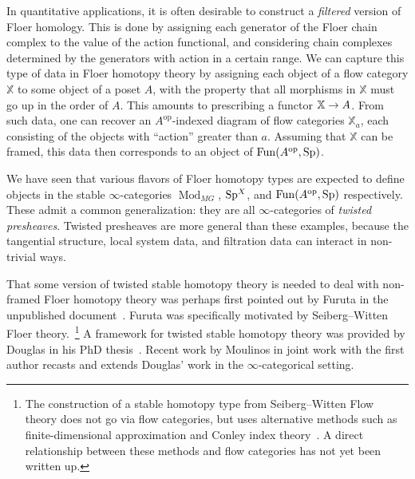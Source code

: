 \documentclass[10pt]{amsart}
\numberwithin{equation}{section}
\theoremstyle{definition}
\DeclareMathOperator{\Fun}{Fun}
\DeclareMathOperator{\Mod}{Mod}
\DeclareMathOperator{\op}{op}
\newcommand{\bX}{\mathbb{X}}
\newcommand{\Sp}{\mathrm{Sp}\vphantom{p}}
\renewcommand{\to}{\mathchoice{\longrightarrow}{\rightarrow}{}{}}
\begin{document}
In quantitative applications, it is often desirable to construct a \emph{filtered} version of Floer homology.
This is done by assigning each generator of the Floer chain complex to the value of the action functional, and considering chain complexes determined by the generators with action in a certain range.
We can capture this type of data in Floer homotopy theory by assigning each object of a flow category $\bX$ to some object of a poset $A$, with the property that all morphisms in $\bX$ must go up in the order of $A$.
This amounts to prescribing a functor $\bX\to A$.
From such data, one can recover an $A^{\op}$-indexed diagram of flow categories $\bX_{a}$, each consisting of the objects with ``action'' greater than $a$. Assuming that $\bX$ can be framed, this data then corresponds to an object of $\Fun(A^{\op},\Sp)$.

We have seen that various flavors of Floer homotopy types are expected to define objects in the stable $\infty$-categories $\Mod_{MG}$, $\Sp^{X}$, and $\Fun(A^{\op},\Sp)$ respectively.
These admit a common generalization: they are all  $\infty$-categories of \emph{twisted presheaves}.
Twisted presheaves are more general than these examples, because the tangential structure, local system data, and filtration data can interact in non-trivial ways.

That some version of twisted stable homotopy theory is needed to deal with non-framed Floer homotopy theory was perhaps first pointed out by Furuta in the unpublished document~\cite{furuta2002prespectrum}.
Furuta was specifically motivated by Seiberg--Witten Floer theory.~\footnote{The construction of a stable homotopy type from Seiberg--Witten Flow theory does not go via flow categories, but uses alternative methods such as finite-dimensional approximation and Conley index theory~\cite{manolescu2003seiberg}.
A direct relationship between these methods and flow categories has not yet been written up.}
A framework for twisted stable homotopy theory was provided by Douglas in his PhD thesis~\cite{Dou}.
Recent work by Moulinos in joint work with the first author recasts and extends Douglas' work in the $\infty$-categorical setting.
\end{document}
